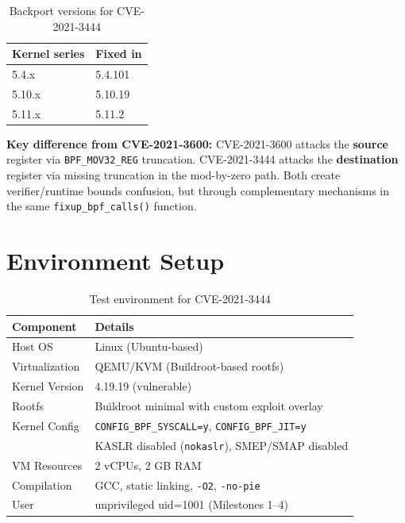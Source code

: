 \begin{table}[H]
\centering
\begin{tabular}{@{}ll@{}}
\toprule
\textbf{Kernel series} & \textbf{Fixed in} \\
\midrule
5.4.x & 5.4.101 \\
5.10.x & 5.10.19 \\
5.11.x & 5.11.2 \\
\bottomrule
\end{tabular}
\caption{Backport versions for CVE-2021-3444}
\end{table}

\textbf{Key difference from CVE-2021-3600:}
CVE-2021-3600 attacks the \textbf{source} register via \texttt{BPF\_\allowbreak MOV32\_\allowbreak REG} truncation. CVE-2021-3444 attacks the \textbf{destination} register via missing truncation in the mod-by-zero path. Both create verifier/runtime bounds confusion, but through complementary mechanisms in the same \texttt{fixup\_\allowbreak bpf\_\allowbreak calls()} function.


\section{Environment Setup}

\begin{table}[H]
\centering
\begin{tabular}{@{}ll@{}}
\toprule
\textbf{Component} & \textbf{Details} \\
\midrule
Host OS & Linux (Ubuntu-based) \\
Virtualization & QEMU/KVM (Buildroot-based rootfs) \\
Kernel Version & 4.19.19 (vulnerable) \\
Rootfs & Buildroot minimal with custom exploit overlay \\
Kernel Config & \texttt{CONFIG\_BPF\_SYSCALL=y}, \texttt{CONFIG\_BPF\_JIT=y} \\
& KASLR disabled (\texttt{nokaslr}), SMEP/SMAP disabled \\
VM Resources & 2 vCPUs, 2 GB RAM \\
Compilation & GCC, static linking, \texttt{-O2}, \texttt{-no-pie} \\
User & unprivileged uid=1001 (Milestones 1--4) \\
\bottomrule
\end{tabular}
\caption{Test environment for CVE-2021-3444}
\end{table}

